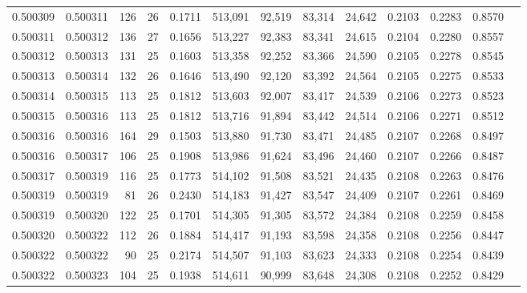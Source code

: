 \begin{tabular}{rrrrrrrrrrrrr}
0.500309 & 0.500311 & 126 &  26 &                                     0.1711 & 513,091 &  92,519 &  83,314 &  24,642 & 0.2103 & 0.2283 & 0.8570 \\
0.500311 & 0.500312 & 136 &  27 &                                     0.1656 & 513,227 &  92,383 &  83,341 &  24,615 & 0.2104 & 0.2280 & 0.8557 \\
0.500312 & 0.500313 & 131 &  25 &                                     0.1603 & 513,358 &  92,252 &  83,366 &  24,590 & 0.2105 & 0.2278 & 0.8545 \\
0.500313 & 0.500314 & 132 &  26 &                                     0.1646 & 513,490 &  92,120 &  83,392 &  24,564 & 0.2105 & 0.2275 & 0.8533 \\
0.500314 & 0.500315 & 113 &  25 &                                     0.1812 & 513,603 &  92,007 &  83,417 &  24,539 & 0.2106 & 0.2273 & 0.8523 \\
0.500315 & 0.500316 & 113 &  25 &                                     0.1812 & 513,716 &  91,894 &  83,442 &  24,514 & 0.2106 & 0.2271 & 0.8512 \\
0.500316 & 0.500316 & 164 &  29 &                                     0.1503 & 513,880 &  91,730 &  83,471 &  24,485 & 0.2107 & 0.2268 & 0.8497 \\
0.500316 & 0.500317 & 106 &  25 &                                     0.1908 & 513,986 &  91,624 &  83,496 &  24,460 & 0.2107 & 0.2266 & 0.8487 \\
0.500317 & 0.500319 & 116 &  25 &                                     0.1773 & 514,102 &  91,508 &  83,521 &  24,435 & 0.2108 & 0.2263 & 0.8476 \\
0.500319 & 0.500319 &  81 &  26 &                                     0.2430 & 514,183 &  91,427 &  83,547 &  24,409 & 0.2107 & 0.2261 & 0.8469 \\
0.500319 & 0.500320 & 122 &  25 &                                     0.1701 & 514,305 &  91,305 &  83,572 &  24,384 & 0.2108 & 0.2259 & 0.8458 \\
0.500320 & 0.500322 & 112 &  26 &                                     0.1884 & 514,417 &  91,193 &  83,598 &  24,358 & 0.2108 & 0.2256 & 0.8447 \\
0.500322 & 0.500322 &  90 &  25 &                                     0.2174 & 514,507 &  91,103 &  83,623 &  24,333 & 0.2108 & 0.2254 & 0.8439 \\
0.500322 & 0.500323 & 104 &  25 &                                     0.1938 & 514,611 &  90,999 &  83,648 &  24,308 & 0.2108 & 0.2252 & 0.8429 \\

\end{tabular}
